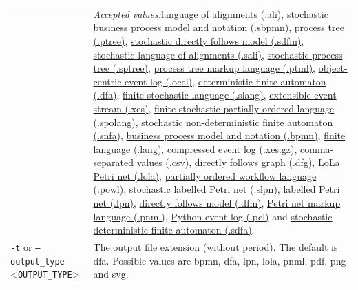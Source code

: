 {\begin{tabularx}{\linewidth}{lX}
&\textit{Accepted values:}\quad \hyperref[filehandler:language of alignments]{language of alignments (.ali)}, \hyperref[filehandler:stochastic business process model and notation]{stochastic business process model and notation (.sbpmn)}, \hyperref[filehandler:process tree]{process tree (.ptree)}, \hyperref[filehandler:stochastic directly follows model]{stochastic directly follows model (.sdfm)}, \hyperref[filehandler:stochastic language of alignments]{stochastic language of alignments (.sali)}, \hyperref[filehandler:stochastic process tree]{stochastic process tree (.sptree)}, \hyperref[filehandler:process tree markup language]{process tree markup language (.ptml)}, \hyperref[filehandler:object-centric event log]{object-centric event log (.ocel)}, \hyperref[filehandler:deterministic finite automaton]{deterministic finite automaton (.dfa)}, \hyperref[filehandler:finite stochastic language]{finite stochastic language (.slang)}, \hyperref[filehandler:extensible event stream]{extensible event stream (.xes)}, \hyperref[filehandler:finite stochastic partially ordered language]{finite stochastic partially ordered language (.spolang)}, \hyperref[filehandler:stochastic non-deterministic finite automaton]{stochastic non-deterministic finite automaton (.snfa)}, \hyperref[filehandler:business process model and notation]{business process model and notation (.bpmn)}, \hyperref[filehandler:finite language]{finite language (.lang)}, \hyperref[filehandler:compressed event log]{compressed event log (.xes.gz)}, \hyperref[filehandler:comma-separated values]{comma-separated values (.csv)}, \hyperref[filehandler:directly follows graph]{directly follows graph (.dfg)}, \hyperref[filehandler:LoLa Petri net]{LoLa Petri net (.lola)}, \hyperref[filehandler:partially ordered workflow language]{partially ordered workflow language (.powl)}, \hyperref[filehandler:stochastic labelled Petri net]{stochastic labelled Petri net (.slpn)}, \hyperref[filehandler:labelled Petri net]{labelled Petri net (.lpn)}, \hyperref[filehandler:directly follows model]{directly follows model (.dfm)}, \hyperref[filehandler:Petri net markup language]{Petri net markup language (.pnml)}, \hyperref[filehandler:Python event log]{Python event log (.pel)} and \hyperref[filehandler:stochastic deterministic finite automaton]{stochastic deterministic finite automaton (.sdfa)}.\\
\texttt{-t} or \texttt{--output\_type} <\texttt{OUTPUT\_TYPE}> &
The output file extension (without period). The default is dfa. Possible values are bpmn, dfa, lpn, lola, pnml, pdf, png and svg.\\

\end{tabularx}}
